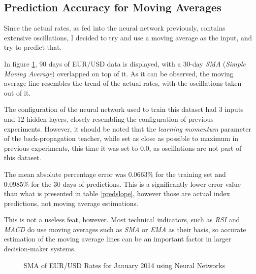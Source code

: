 \documentclass[a4paper,12pt]{article}
\begin{document}
\clearpage
\newpage
\subsection{Prediction Accuracy for Moving Averages}

	Since the actual rates, as fed into the neural network previously, contains extensive oscillations, I decided to try and use a moving average as the input, and try to predict that.
	
	In figure \ref{eur_usd_sma_january_90}, 90 days of EUR/USD data is displayed, with a 30-day \textit{SMA} (\textit{Simple Moving Average}) overlapped on top of it. As it can be observed, the moving average line resembles the trend of the actual rates, with the oscillations taken out of it.
	
	The configuration of the neural network used to train this dataset had 3 inputs and 12 hidden layers, closely resembling the configuration of previous experiments. However, it should be noted that the \textit{learning momentum} parameter of the back-propagation teacher, while set as close as possible to maximum in previous experiments, this time it was set to $0.0$, as oscillations are not part of this dataset.

	The mean absolute percentage error was $0.0663\%$ for the training set and $0.0985\%$ for the 30 days of predictions. This is a significantly lower error value than what is presented in table \ref{predslope}, however those are actual index predictions, not moving average estimations.

	This is not a useless feat, however. Most technical indicators, such as \textit{RSI} and \textit{MACD} do use moving averages such as \textit{SMA} or \textit{EMA} as their basis, so accurate estimation of the moving average lines can be an important factor in larger decision-maker systems.

	\begin{figure}[!htbp]
		\centering
		\caption{SMA of EUR/USD Rates for January 2014 using Neural Networks}
		\label{eur_usd_sma_january_90}
	\end{figure}
\end{document}
